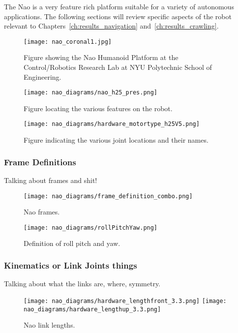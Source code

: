 The Nao is a very feature rich platform suitable for a variety of autonomous
applications. The following sections will review specific aspects of the robot
relevant to Chapters~\ref{ch:results_navigation} and~\ref{ch:results_crawling}.


\begin{figure}
\centering
\texttt{[image: nao\_coronal1.jpg]}
\caption{Figure showing the Nao Humanoid Platform at the Control/Robotics
         Research Lab at NYU Polytechnic School of Engineering.}
\label{fig:crrl_nao_coronal1}
\end{figure}

\begin{figure}
\centering
\texttt{[image: nao\_diagrams/nao\_h25\_pres.png]}
\caption{Figure locating the various features on the robot.}
\label{fig:nao_features1}
\end{figure}

\begin{figure}
\centering
\texttt{[image: nao\_diagrams/hardware\_motortype\_h25V5.png]}
\caption{Figure indicating the various joint locations and their names.}
\label{fig:nao_joints1}
\end{figure}



\subsubsection{Frame Definitions}
Talking about frames and shit!

\begin{figure}
\centering
\texttt{[image: nao\_diagrams/frame\_definition\_combo.png]}
\caption{Nao frames.}
\label{fig:nao_frames1}
\end{figure}

\begin{figure}
\centerline{\texttt{[image: nao\_diagrams/rollPitchYaw.png]}
}
\caption{Definition of roll pitch and yaw.}
\label{fig:nao_rpy_def1}
\end{figure}

\subsubsection{Kinematics or Link Joints things}
Talking about what the links are, where, symmetry.

\begin{figure}
\centerline{\texttt{[image: nao\_diagrams/hardware\_lengthfront\_3.3.png]}
            \texttt{[image: nao\_diagrams/hardware\_lengthup\_3.3.png]}
}
\caption{Nao link lengths.}
\label{fig:nao_link_lengths1}
\end{figure}

